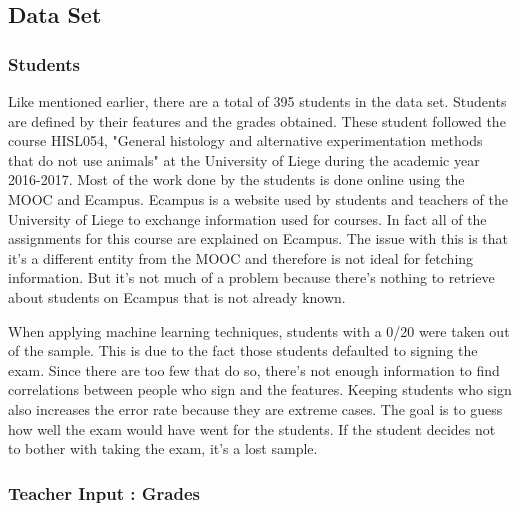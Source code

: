 \documentclass[a4paper,11pt]{report}
\numberwithin{figure}{section} %
\begin{document}
    \subsection{Data Set} \label{Data_Set}
    
    	\subsubsection{Students}
    Like mentioned earlier, there are a total of 395 students in the data set. Students are defined by their features and the grades obtained. These student followed the course HISL054, "General histology and alternative experimentation methods that do not use animals" at the University of Liege during the academic year 2016-2017. Most of the work done by the students is done online using the MOOC and Ecampus. Ecampus is a website used by students and teachers of the University of Liege to exchange information used for courses. In fact all of the assignments for this course are explained on Ecampus. The issue with this is that it's a different entity from the MOOC and therefore is not ideal for fetching information. But it's not much of a problem because there's nothing to retrieve about students on Ecampus that is not already known.\newline
    
    When applying machine learning techniques, students with a 0/20 were taken out of the sample. This is due to the fact those students defaulted to signing the exam. Since there are too few that do so, there's not enough information to find correlations between people who sign and the features. Keeping students who sign also increases the error rate because they are extreme cases. The goal is to guess how well the exam would have went for the students. If the student decides not to bother with taking the exam, it's a lost sample.\newline
    
    	\subsubsection{Teacher Input : Grades}
    
    
\end{document}
